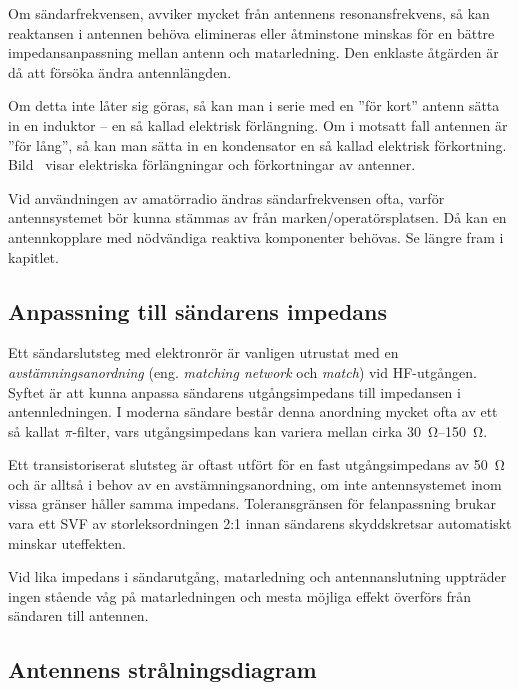 Om sändarfrekvensen, avviker mycket från antennens resonansfrekvens,
så kan reaktansen i antennen behöva elimineras eller åtminstone
minskas för en bättre impedansanpassning mellan antenn och matarledning.
Den enklaste åtgärden är då att försöka ändra antennlängden.

Om detta inte låter sig göras, så kan man i serie med en ''för kort'' antenn
sätta in en induktor -- en så kallad elektrisk förlängning.
Om i motsatt fall antennen är ''för lång'', så kan man sätta in en
kondensator en så kallad elektrisk förkortning.
Bild~ visar elektriska förlängningar och förkortningar av
antenner.

Vid användningen av amatörradio ändras sändarfrekvensen ofta, varför
antennsystemet bör kunna stämmas av från marken/operatörsplatsen.
Då kan en antennkopplare med nödvändiga reaktiva komponenter behövas.
Se längre fram i kapitlet.

\subsection{Anpassning till sändarens impedans}
\label{antenner_ståendevåg}

Ett sändarslutsteg med elektronrör är vanligen utrustat med en
\emph{avstämningsanordning} (eng. \emph{matching network} och \emph{match})
vid HF-utgången.
Syftet är att kunna anpassa sändarens utgångsimpedans till impedansen i
antennledningen.
I moderna sändare består denna anordning mycket ofta av ett så kallat
\(\pi \)-filter, vars utgångsimpedans kan variera mellan cirka
\SIrange{30}{150}{\ohm}.

Ett transistoriserat slutsteg är oftast utfört för en fast utgångsimpedans av
\qty{50}{\ohm} och är alltså i behov av en avstämningsanordning, om inte
antennsystemet inom vissa gränser håller samma impedans.
Toleransgränsen för felanpassning brukar vara ett SVF av storleksordningen 2:1
innan sändarens skyddskretsar automatiskt minskar uteffekten.

Vid lika impedans i sändarutgång, matarledning och antennanslutning
uppträder ingen stående våg på matarledningen och mesta möjliga effekt
överförs från sändaren till antennen.

\subsection{Antennens strålningsdiagram}


